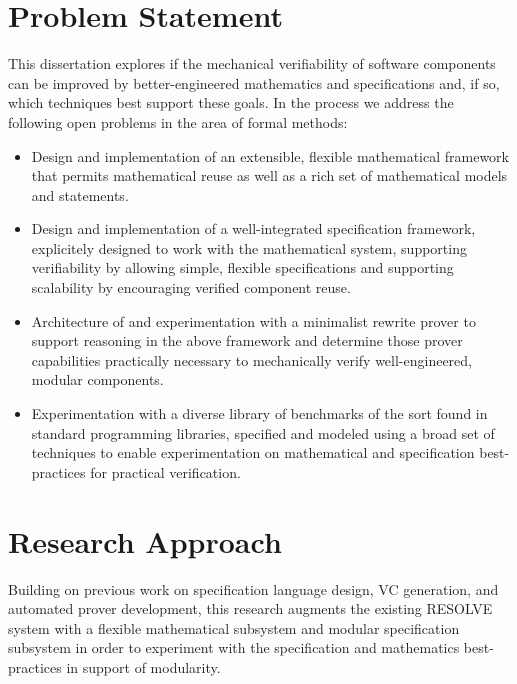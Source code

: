 \section{Problem Statement}
This dissertation explores if the mechanical verifiability of software components can be improved by better-engineered mathematics and specifications and, if so, which techniques best support these goals.  In the process we address the following open problems in the area of formal methods:

\begin{itemize}
\item Design and implementation of an extensible, flexible mathematical framework that permits mathematical reuse as well as a rich set of mathematical models and statements.
\item Design and implementation of a well-integrated specification framework, explicitely designed to work with the mathematical system, supporting verifiability by allowing simple, flexible specifications and supporting scalability by encouraging verified component reuse.
\item Architecture of and experimentation with a minimalist rewrite prover to support reasoning in the above framework and determine those prover capabilities practically necessary to mechanically verify well-engineered, modular components.
\item Experimentation with a diverse library of benchmarks of the sort found in standard programming libraries, specified and modeled using a broad set of techniques to enable experimentation on mathematical and specification best-practices for practical verification.
\end{itemize}

\section{Research Approach}
Building on previous work on specification language design, VC generation, and automated prover development, this research augments the existing RESOLVE\cite{Sigsoft94,Sit11} system with a flexible mathematical subsystem and modular specification subsystem in order to experiment with the specification and mathematics best-practices in support of modularity.

